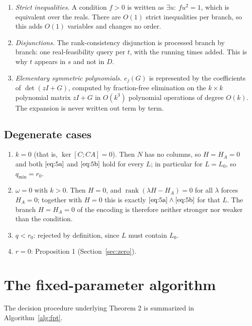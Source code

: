 \documentclass[journal]{IEEEtran}
\theoremstyle{plainn}
\begin{document}
\begin{enumerate}
\item \emph{Strict inequalities.} A condition $f>0$ is written as $\exists u:\ fu^2=1$, which is equivalent over the reals. There are $O(1)$ strict inequalities per branch, so this adds $O(1)$ variables and changes no order.
\item \emph{Disjunctions.} The rank-consistency disjunction is processed branch by branch: one real-feasibility query per $t$, with the running times added. This is why $t$ appears in $s$ and not in $D$.
\item \emph{Elementary symmetric polynomials.} $e_j(G)$ is represented by the coefficients of $\det(zI+G)$, computed by fraction-free elimination on the $k\times k$ polynomial matrix $zI+G$ in $O(k^3)$ polynomial operations of degree $O(k)$. The expansion is never written out term by term.
\end{enumerate}
\subsection{Degenerate cases}\label{sec:deg}
\begin{enumerate}
\item \emph{$k=0$} (that is, $\ker[C;CA]=0$). Then $N$ has no columns, so $H=H_A=0$ and both $\eqref{eq:5a}$ and $\eqref{eq:5b}$ hold for every $L$; in particular for $L=L_0$, so $q_{\min}=r_0$.
\item \emph{$\omega=0$} with $k>0$. Then $H=0$, and $\operatorname{rank}(\lambda H-H_A)=0$ for all $\lambda$ forces $H_A=0$; together with $H=0$ this is exactly $\eqref{eq:5a}\wedge\eqref{eq:5b}$ for that $L$. The branch $H=H_A=0$ of the encoding is therefore neither stronger nor weaker than the condition.
\item \emph{$q<r_0$}: rejected by definition, since $L$ must contain $L_0$.
\item \emph{$r=0$}: Proposition 1 (Section~\ref{sec:zero}).
\end{enumerate}

\section{The fixed-parameter algorithm}\label{sec:fpt}
The decision procedure underlying Theorem 2 is summarized in
Algorithm~\ref{alg:fpt}.
\end{document}
